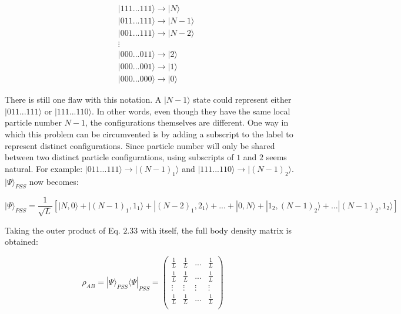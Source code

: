 \begin {align*}
&| 111...111 \rangle \to | N \rangle \\
&| 011...111 \rangle \to | N-1 \rangle \\
&| 001...111 \rangle \to | N-2 \rangle \\
&\vdots \\
&| 000...011 \rangle \to | 2 \rangle \\
&| 000...001 \rangle \to | 1 \rangle \\
&| 000...000 \rangle \to | 0 \rangle 
\end {align*}

There is still one flaw with this notation. A $| N-1 \rangle $ state could represent either $| 011...111 \rangle $ or $|111...110 \rangle $. In other words, even though they have the same local particle number $N-1$, the configurations themselves are different. One way in which this problem can be circumvented is by adding a subscript to the label to represent distinct configurations. Since particle number will only be shared between two distinct particle configurations, using subscripts of $1$ and $2$ seems natural. For example: $| 011...111 \rangle \to | (N-1)_1 \rangle$ and $|111...110 \rangle \to | (N-1)_2 \rangle$. $|\Psi\rangle_{PSS}$ now becomes:

\begin{equation}
| \Psi \rangle_{PSS} = \frac{1}{\sqrt{L}} [ |N, 0 \rangle + |(N-1)_1, 1_1 \rangle + |(N-2)_1, 2_1 \rangle  
+ ...  + |0, N \rangle + |1_2, (N-1)_2 \rangle + ... |(N-1)_2, 1_2 \rangle ]
\end{equation}

Taking the outer product of Eq. $2.33$ with itself, the full body density matrix is obtained:

\begin{equation}
\rho_{AB} = | \Psi \rangle_{PSS} \langle \Psi |_{PSS} = 
\begin{pmatrix} 
\frac{1}{L} & \frac{1}{L} & ... & \frac{1}{L} \\
\frac{1}{L} & \frac{1}{L} & ... & \frac{1}{L} \\
\vdots & \vdots & \vdots & \vdots \\
\frac{1}{L} & \frac{1}{L} & ... & \frac{1}{L} \\
\end{pmatrix}
\end{equation}

